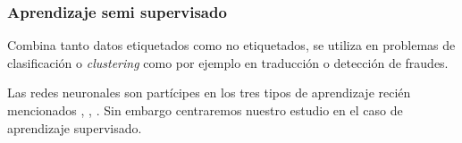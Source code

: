 \subsubsection{Aprendizaje semi supervisado }
Combina tanto datos etiquetados como no etiquetados, 
se utiliza en problemas de clasificación o \textit{clustering}
como por ejemplo en traducción o detección de fraudes.


Las redes neuronales son partícipes en los tres tipos de aprendizaje 
recién mencionados
\cite{8612259}, \cite{DBLP:journals/corr/BakerGNR16}, \cite{10.5555/2955491.2955578}. Sin embargo centraremos nuestro estudio en el caso 
de aprendizaje supervisado. 


